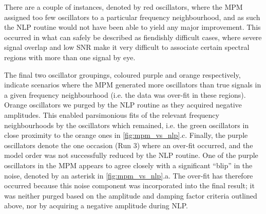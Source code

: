 There are a couple of instances, denoted by red oscillators,
where the \ac{MPM} assigned too few oscillators to a particular frequency
neighbourhood, and as such the \ac{NLP} routine would not have been able to
yield any major improvement. This occurred in what can safely be described as
fiendishly difficult cases, where severe signal overlap and low \ac{SNR} make
it very difficult to associate certain spectral regions with more than one
signal by eye.

The final two oscillator groupings, coloured purple and orange respectively,
indicate scenarios where the \ac{MPM} generated more oscillators than true
signals in a given frequency neighbourhood (i.e. the data was over-fit in these
regions). Orange
oscillators we purged by the \ac{NLP} routine as they acquired negative
amplitudes. This enabled parsimonious fits of the relevant frequency neighbourhoods by
the oscillators which remained, i.e. the green oscillators in close proximity
to the orange ones in \cref{fig:mpm_vs_nlp}.c. Finally, the purple oscillators
denote the one
occasion (Run 3) where an over-fit occurred, and the model order was not
successfully reduced by the \ac{NLP} routine. One of the purple oscillators in
the \ac{MPM} appears to agree closely with a significant ``blip'' in the noise,
denoted by an asterisk in \cref{fig:mpm_vs_nlp}.a.
The over-fit has therefore occurred because this noise component was
incorporated into the final result; it was neither purged based on the
amplitude and damping factor criteria outlined above, nor by acquiring a
negative amplitude during \ac{NLP}.

